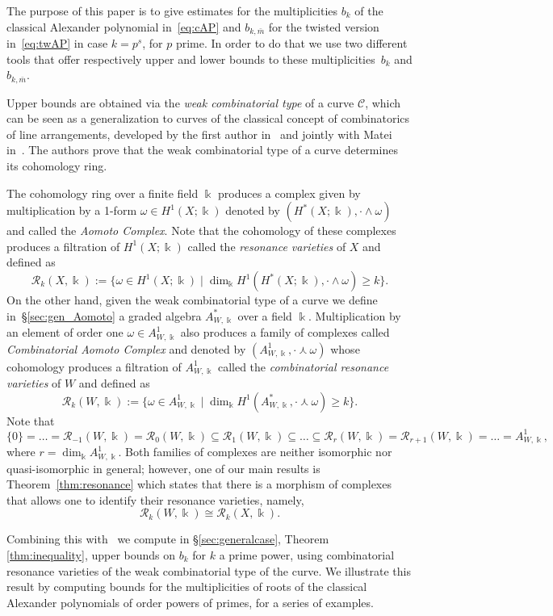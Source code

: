 \documentclass[11pt]{amsart}
\def\cC{\mathcal{C}}
\def\cR{{\mathcal R}}
\def\kk{\Bbbk}
\def\w{\omega}
\theoremstyle{plain}
\theoremstyle{definition}
\begin{document}
The purpose of this paper is to give estimates for the multiplicities $b_k$ of the classical Alexander polynomial in~\eqref{eq:cAP} and $b_{k,\bar m}$ for the twisted version in~\eqref{eq:twAP} in case $k=p^s$, for $p$ prime.
In order to do that we use two different tools that offer respectively upper and lower bounds to these multiplicities~$b_{k}$ and $b_{k,\bar m}$. 

Upper bounds are obtained via the \emph{weak combinatorial type} of a curve $\cC$, which can be seen as a generalization to curves of the classical concept of combinatorics of line arrangements, developed by the first author in~\cite{C} and jointly with Matei in~\cite{CM}. The authors prove that the weak combinatorial type of a curve determines its cohomology ring. 

The cohomology ring over a finite field $\kk$ produces a complex given by multiplication by a 1-form $\w\in H^1(X;\kk)$ denoted by 
$(H^*(X;\kk),\cdot\wedge\w)$ 
and called the \emph{Aomoto Complex}. Note that the cohomology of these complexes produces a filtration of $H^1(X;\kk)$ called the \emph{resonance varieties} of $X$ and defined as
$$\cR_k(X,\kk):=\{\w \in H^1(X;\kk) \mid \dim_\kk H^1(H^*(X;\kk),\cdot\wedge\w)\geq k\}.$$
On the other hand, given the weak combinatorial type of a curve we define in~\S\ref{sec:gen_Aomoto} a graded algebra $A_{W,\kk}^*$ over a field $\kk$. Multiplication by an element of order one $\w\in A_{W,\kk}^1$ also produces a family of complexes called \emph{Combinatorial Aomoto Complex} and denoted by $(A_{W,\kk}^1,\cdot\curlywedge\w)$
whose cohomology produces a filtration of $A_{W,\kk}^1$ called the \emph{combinatorial resonance varieties} of $W$ and defined as
$$\cR_k(W,\kk):=\{\omega \in A_{W,\kk}^1 \mid \dim_\kk H^1(A_{W,\kk}^*,\cdot\curlywedge \w)\geq k\}.$$
Note that 
$$\{0\}=\dots =\cR_{-1}(W,\kk)=\cR_0(W,\kk)\subseteq \cR_1(W,\kk)\subseteq\dots\subseteq\cR_r(W,\kk)=\cR_{r+1}(W,\kk)=\dots = A^1_{W,\kk},$$
where $r=\dim_\kk A^1_{W,\kk}$.
Both families of complexes are neither isomorphic nor quasi-isomorphic in general; however, one of our main results is Theorem~\ref{thm:resonance} which states that there is a morphism of complexes that allows one to identify their resonance varieties, namely,
$$\cR_k(W,\kk)\cong\cR_k(X,\kk).$$

Combining this with~\cite[Theorem C]{PS2} we compute in \S\ref{sec:generalcase}, Theorem \ref{thm:inequality}, upper bounds on $b_k$ for $k$ a prime power, using combinatorial resonance varieties of the weak combinatorial type of the curve. We illustrate this result by computing bounds for the multiplicities of roots of the classical Alexander polynomials of order powers of  primes, for a series of examples.
\end{document}
